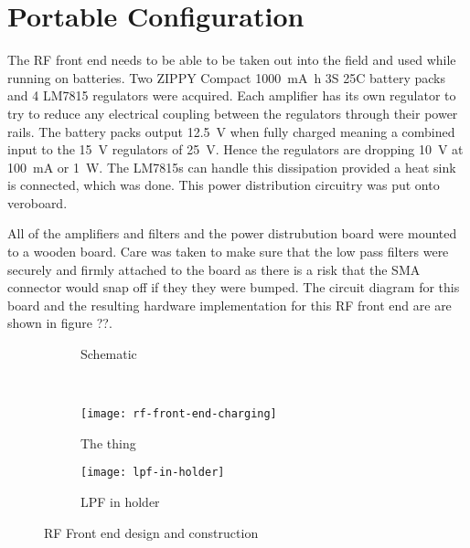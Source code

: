 \section{Portable Configuration}
The RF front end needs to be able to be taken out into the field and used while running on batteries.
Two ZIPPY Compact \SI{1000}{\milli\ampere\hour} 3S 25C battery packs and 4 LM7815 regulators were acquired. 
Each amplifier has its own regulator to try to reduce any electrical coupling between the regulators through their power rails.
The battery packs output \SI{12.5}{\volt} when fully charged meaning a combined input to the \SI{15}{\volt} regulators of \SI{25}{\volt}. Hence the regulators are dropping \SI{10}{\volt} at \SI{100}{\milli\ampere} or \SI{1}{\watt}.
The LM7815s can handle this dissipation provided a heat sink is connected, which was done.
This power distribution circuitry was put onto veroboard.

All of the amplifiers and filters and the power distrubution board were mounted to a wooden board.
Care was taken to make sure that the low pass filters were securely and firmly attached to the board as there is a risk that the SMA connector would snap off if they they were bumped. 
The circuit diagram for this board and the resulting hardware implementation for this RF front end are are shown in figure ??.


\begin{figure}
  \centering
  \begin{subfigure}{\textwidth}
    \centering
    
    \caption{Schematic}
  \end{subfigure}\\[1em]
  \begin{subfigure}{\textwidth}
    \centering
    \texttt{[image: rf-front-end-charging]}
    \caption{The thing}
  \end{subfigure}
  \begin{subfigure}{\textwidth}
    \centering
    \texttt{[image: lpf-in-holder]}
    \caption{LPF in holder}
  \end{subfigure}
  \caption{RF Front end design and construction}
\end{figure}
